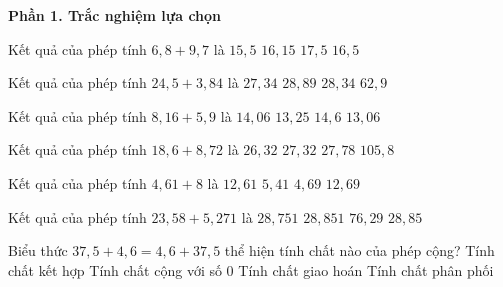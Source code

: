 \textbf{Phần 1. Trắc nghiệm lựa chọn}

\begin{ex} %
Kết quả của phép tính $6{,}8 + 9{,}7$ là
\choice
{$15{,}5$}
{$16{,}15$}
{$17{,}5$}
{\True $16{,}5$}
\end{ex}

\begin{ex} %
Kết quả của phép tính $24{,}5 + 3{,}84$ là
\choice
{$27{,}34$}
{$28{,}89$}
{\True $28{,}34$}
{$62{,}9$}
\end{ex}

\begin{ex} %
Kết quả của phép tính $8{,}16 + 5{,}9$ là
\choice
{\True $14{,}06$}
{$13{,}25$}
{$14{,}6$}
{$13{,}06$}
\end{ex}

\begin{ex} %
Kết quả của phép tính $18{,}6 + 8{,}72$ là
\choice
{$26{,}32$}
{\True $27{,}32$}
{$27{,}78$}
{$105{,}8$}
\end{ex}

\begin{ex} %
Kết quả của phép tính $4{,}61 + 8$ là
\choice
{\True $12{,}61$}
{$5{,}41$}
{$4{,}69$}
{$12{,}69$}
\end{ex}

\begin{ex} %
Kết quả của phép tính $23{,}58 + 5{,}271$ là
\choice
{$28{,}751$}
{\True $28{,}851$}
{$76{,}29$}
{$28{,}85$}
\end{ex}

\begin{ex} %
Biểu thức $37{,}5 + 4{,}6 = 4{,}6 + 37{,}5$ thể hiện tính chất nào của phép cộng?
\choice
{Tính chất kết hợp}
{Tính chất cộng với số 0}
{\True Tính chất giao hoán}
{Tính chất phân phối}
\end{ex}

